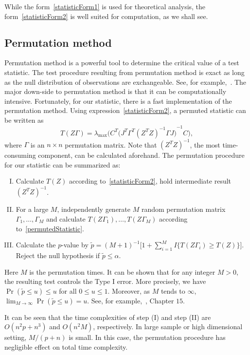 \documentclass[review]{elsarticle}
\theoremstyle{plain}
\theoremstyle{definition}
\theoremstyle{remark}
\begin{document}
While the form~\eqref{statisticForm1} is used for theoretical analysis, the form~\eqref{statisticForm2} is well suited for computation, as we shall see.
\subsection{Permutation method}
Permutation method is a powerful tool to determine the critical value of a test statistic.
   The test procedure resulting from permutation method is exact as long as the null distribution of observations are exchangeable. See, for example,~\cite{Romano1990On}.
   The major down-side to permutation method is that it can be computationally intensive.
   Fortunately, for our statistic, there is a fast implementation of the permutation method.
   Using expression~\eqref{statisticForm2}, a permuted statistic can be written as
    \begin{equation}\label{permutedStatistic}
        T(Z\Gamma)=\lambda_{\max}\Big(C^T{\big( J^T \Gamma^T {(Z^T Z)}^{-1} \Gamma J \big)}^{-1}  C\Big),
    \end{equation}
where $\Gamma$ is an $n\times n$ permutation matrix.
   Note that ${(Z^T Z)}^{-1}$, the most time-consuming component, can be calculated aforehand.
   The permutation procedure for our statistic can be summarized as:
   \begin{enumerate}[(I)]
       \item Calculate $T(Z)$ according to~\eqref{statisticForm2}, hold intermediate result ${(Z^T Z)}^{-1}$.
       \item For a large $M$, independently generate $M$ random permutation matrix $\Gamma_1,\ldots,\Gamma_M$ and calculate $T(Z\Gamma_1),\ldots,T(Z\Gamma_M)$ according to~\eqref{permutedStatistic}. 
       \item Calculate the $p$-value by
           $
           \tilde{p}={(M+1)}^{-1}\big[1+\sum_{i=1}^M I\{T(Z\Gamma_i)\geq T(Z)\}\big]
           $.
           Reject the null hypothesis if $\tilde{p}\leq \alpha$.
   \end{enumerate}

Here $M$ is the permutation times. 
   It can be shown that for any integer $M>0$, the resulting test controls the Type I error. More precisely, we have $\Pr(\tilde{p}\leq u)\leq u$ for all $0\leq u\leq 1$.
   Moreover, as $M$ tends to $\infty$, $\lim_{M\to \infty}\Pr(\tilde{p}\leq u)= u$.
   See, for example,~\cite{Lehmann}, Chapter $15$.

   It can be seen that the time complexities of step (I) and step (II) are $O(n^2 p +n^3)$ and $O(n^2 M)$, respectively.
   In large sample or high dimensional setting, $M/(p+n)$ is small. In this case, the permutation procedure has negligible effect on total time complexity.
\end{document}
